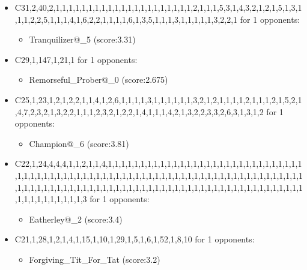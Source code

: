 \begin{appendices}
\begin{itemize}
        \item C31,2,40,2,1,1,1,1,1,1,1,1,1,1,1,1,1,1,1,1,1,1,1,1,1,2,1,1,1,5,3,1,4,3,2,1,2,1,5,1,3,1,1,1,2,2,5,1,1,1,4,1,6,2,2,1,1,1,1,6,1,3,5,1,1,1,3,1,1,1,1,1,3,2,2,1 for 1 opponents:
        \begin{multicols}{3}
            \begin{itemize}
                \item Tranquilizer@\_5 (score:3.31)
            \end{itemize}
        \end{multicols}

        \item C29,1,147,1,21,1 for 1 opponents:
        \begin{multicols}{3}
            \begin{itemize}
                \item Remorseful\_Prober@\_0 (score:2.675)
            \end{itemize}
        \end{multicols}

        \item C25,1,23,1,2,1,2,2,1,1,4,1,2,6,1,1,1,1,3,1,1,1,1,1,1,3,2,1,2,1,1,1,1,2,1,1,1,2,1,5,2,1,4,7,2,3,2,1,3,2,2,1,1,1,2,3,2,1,2,2,1,4,1,1,1,4,2,1,3,2,2,3,3,2,6,3,1,3,1,2 for 1 opponents:
        \begin{multicols}{3}
            \begin{itemize}
                \item Champion@\_6 (score:3.81)
            \end{itemize}
        \end{multicols}

        \item C22,1,24,4,4,4,1,1,2,1,1,4,1,1,1,1,1,1,1,1,1,1,1,1,1,1,1,1,1,1,1,1,1,1,1,1,1,1,1,1,1,1,1,1,1,1,1,1,1,1,1,1,1,1,1,1,1,1,1,1,1,1,1,1,1,1,1,1,1,1,1,1,1,1,1,1,1,1,1,1,1,1,1,1,1,1,1,1,1,1,1,1,1,1,1,1,1,1,1,1,1,1,1,1,1,1,1,1,1,1,1,1,1,1,1,1,1,1,1,1,1,1,1,1,1,1,1,1,1,1,1,1,1,1,1,1,1,1,1,1,3 for 1 opponents:
        \begin{multicols}{3}
            \begin{itemize}
                \item Eatherley@\_2 (score:3.4)
            \end{itemize}
        \end{multicols}

        \item C21,1,28,1,2,1,4,1,15,1,10,1,29,1,5,1,6,1,52,1,8,10 for 1 opponents:
        \begin{multicols}{3}
            \begin{itemize}
                \item Forgiving\_Tit\_For\_Tat (score:3.2)
            \end{itemize}
        \end{multicols}


\end{itemize}
\end{appendices}
